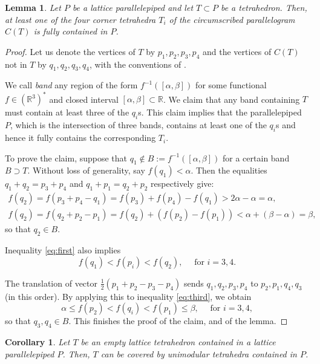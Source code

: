 \documentclass{amsart}
\theoremstyle{plain}
\newtheorem{lemma}[theorem]{Lemma}
\newtheorem{corollary}[theorem]{Corollary}
\theoremstyle{definition}
\newcommand{\R}{ \ensuremath{\mathbb{R}}}
\begin{document}
\begin{lemma}
\label{lemma:3<4}
Let $P$ be a lattice parallelepiped and let $T\subset P$ be a tetrahedron. Then, at least one of the four corner tetrahedra $T_i$ of the circumscribed parallelogram $C(T)$ is fully contained in $P$.
\end{lemma}

\begin{proof}
Let us denote the vertices of $T$ by $p_1, p_2, p_3, p_4$ and the vertices of $C(T)$ not in $T$ by $q_1, q_2, q_3, q_4$, with the conventions of . 

We call \emph{band} any region of the form $f^{-1}([\alpha,\beta])$ for some functional $f\in (\R^3)^*$ and closed interval $[\alpha,\beta]\subset \R$.
We claim that any band containing $T$ must contain at least three of the $q_i$s. 
This claim implies that the parallelepiped $P$, which is the intersection of three bands, contains at least one of the $q_i$s and hence it fully contains the corresponding $T_i$.

To prove the claim, suppose that $q_1\not\in B:= f^{-1}([\alpha,\beta])$ for a certain band $B \supset T$. 
Without loss of generality, say $f(q_1)<\alpha$. Then the equalities $q_1+q_2=p_3+p_4$ and $q_1+p_1=q_2+p_2$ respectively give:
\begin{gather}
\label{eq:first}
f(q_2) = f(p_3+p_4-q_1) = f(p_3)+f(p_4)-f(q_1) > 2\alpha-\alpha=\alpha,\\
\label{eq:second}
f(q_2) = f(q_2+p_2-p_1) = f(q_2)+(f(p_2)-f(p_1)) < \alpha + (\beta-\alpha) = \beta,
\end{gather}
so that $q_2 \in B$.

Inequality \eqref{eq:first} also implies
\begin{equation}
\label{eq:third}
f(q_1) <  f(p_i) < f(q_2), \quad\text{ for $i=3,4$}.
\end{equation}

The translation of vector $\frac12 (p_1+p_2-p_3-p_4)$ sends $q_1,q_2,p_3,p_4$ to $p_2,p_1,q_4,q_3$ (in this order). By applying this to inequality \eqref{eq:third}, we obtain
\[
\alpha \le f(p_2) < f(q_i) < f(p_1) \le \beta, \quad\text{ for $i=3,4$},
\]
so that $q_3,q_4 \in B$.
%
This finishes the proof of the claim, and of the lemma.

\end{proof}


\begin{corollary}
\label{coro:coverpara}
Let $T$ be an empty lattice tetrahedron contained in a lattice parallelepiped $P$. Then, $T$ can be covered by unimodular tetrahedra contained in $P$.
\end{corollary}
\end{document}
